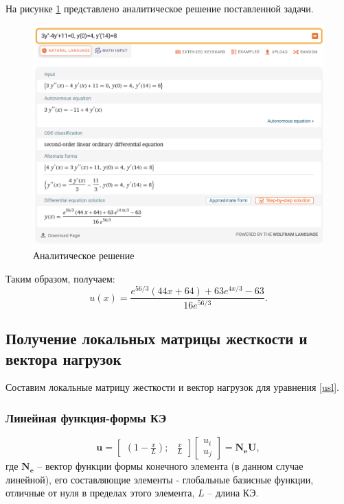 На рисунке \ref{analit} представлено аналитическое решение поставленной задачи.
\begin{figure}[!h]
\begin{center}
\includegraphics[scale = 0.5]{labs/img/img1}
\end{center}
\caption{Аналитическое решение}
\label{analit}
\end{figure}

Таким образом, получаем:
$$
u(x)=\frac{e^{56/3}(44x+64) + 63 e^{4x/3} - 63}{16 e^{56/3}}.
$$


\subsection{Получение локальных матрицы жесткости и вектора нагрузок}

Составим локальные матрицу жесткости и вектор нагрузок для уравнения \ref{usl}.

\subsubsection{Линейная функция-формы КЭ}

$$
\mathbf{u}=\begin{bmatrix}
(1-\frac{x}{L}) ; & \frac{x}{L}
\end{bmatrix}
\begin{bmatrix}
u_i \\
u_j
\end{bmatrix}
=\mathbf{N_eU},
$$
где $\mathbf{N_e}$ -- вектор функции формы конечного элемента (в данном случае линейной), его составляющие элементы - глобальные базисные функции, отличные от нуля в пределах этого элемента, $L$ -- длина КЭ.

